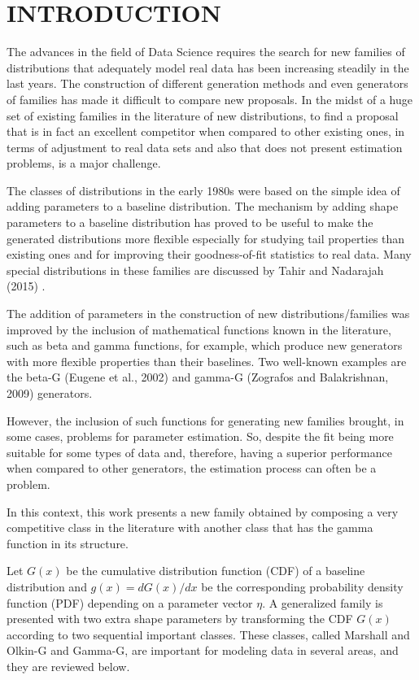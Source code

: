 \documentclass[twoside,leqno,11pt]{article}
\begin{document}
\section{INTRODUCTION}

The advances in the field of Data Science requires the search for new fa\-milies of distributions that adequately model real data has been increasing steadily in the last years.  The construction of different generation methods and even generators of families has made it difficult to compare new proposals. In the midst of a huge set of existing families in the literature of new distributions, to find a proposal that is in fact an excellent competitor when compared to other existing ones, in terms of adjustment to real data sets and also that does not present estimation problems, is a major challenge.

The classes of distributions in the early 1980s were based on the simple idea of adding parameters to a baseline distribution. The mechanism by adding shape parameters to a baseline distribution has proved to be useful to make the 
generated distributions more flexible especially for studying  tail properties than existing ones and for improving their goodness-of-fit statistics to real data. Many special  distributions in these families are discussed by Tahir and Nadarajah (2015) \cite{Tahir}.

The addition of parameters in the construction of new distributions/families was improved by the inclusion of mathematical functions known in the literature, such as beta and gamma functions, for example, which produce new generators with more flexible properties than their baselines. Two well-known examples are the beta-G (Eugene et al., 2002)  \cite{Eugene} and gamma-G (Zografos and Balakrishnan, 2009) \cite{Zografos} generators.

However, the inclusion of such functions for generating new families brought, in some cases, problems for parameter estimation. So, despite the fit being more suitable for some types of data and, therefore, having a superior performance when compared to other generators, the estimation process can  often be a problem.

In this context, this work presents a new family obtained by composing a very competitive class in the literature with another class that has the gamma function in its structure.

Let $G(x)$ be the cumulative distribution function (CDF) of a baseline distribution and $g(x)=dG(x)/dx$ be the corresponding  probability density function (PDF) depending on a parameter vector $\eta$. A generalized family is presented with two extra shape parameters by transforming the CDF $G(x)$ according to two sequential important classes.  These classes, called Marshall and Olkin-G and Gamma-G, are important for modeling data in several areas,  and they are reviewed below. 
\end{document}
